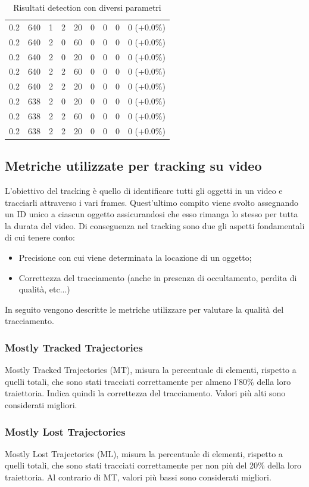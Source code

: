 \begin{table}[h!]
\begin{tabular}{|c|c|c|c|c|c|c|c|c|}
0.2 & 640 & 1 & 2 & 20 & 0 & 0 & 0 & 0 (+0.0\%)\\
0.2 & 640 & 2 & 0 & 60 & 0 & 0 & 0 & 0 (+0.0\%)\\
0.2 & 640 & 2 & 0 & 20 & 0 & 0 & 0 & 0 (+0.0\%)\\
0.2 & 640 & 2 & 2 & 60 & 0 & 0 & 0 & 0 (+0.0\%)\\
0.2 & 640 & 2 & 2 & 20 & 0 & 0 & 0 & 0 (+0.0\%)\\
0.2 & 638 & 2 & 0 & 20 & 0 & 0 & 0 & 0 (+0.0\%)\\
0.2 & 638 & 2 & 2 & 60 & 0 & 0 & 0 & 0 (+0.0\%)\\
0.2 & 638 & 2 & 2 & 20 & 0 & 0 & 0 & 0 (+0.0\%)\\
\hline
\end{tabular}
\caption{Risultati detection con diversi parametri}
\label{risultati detection con diversi parametri}
\end{table}

\subsection{Metriche utilizzate per tracking su video}
L'obiettivo del tracking è quello di identificare tutti gli oggetti in un video e tracciarli attraverso i vari frames. Quest'ultimo compito viene svolto assegnando un ID unico a ciascun oggetto assicurandosi che esso rimanga lo stesso per tutta la durata del video. Di conseguenza nel tracking sono due gli aspetti fondamentali di cui tenere conto:
\begin{itemize}
\item Precisione con cui viene determinata la locazione di un oggetto;
\item Correttezza del tracciamento (anche in presenza di occultamento, perdita di qualità, etc...)
\end{itemize}
In seguito vengono descritte le metriche utilizzare per valutare la qualità del tracciamento.

\subsubsection{Mostly Tracked Trajectories}
Mostly Tracked Trajectories (MT), misura la percentuale di elementi, rispetto a quelli totali, che sono stati tracciati correttamente per almeno l'80\% della loro traiettoria. Indica quindi la correttezza del tracciamento. Valori più alti sono considerati migliori.
\subsubsection{Mostly Lost Trajectories}
Mostly Lost Trajectories (ML), misura la percentuale di elementi, rispetto a quelli totali, che sono stati tracciati correttamente per non più del 20\% della loro traiettoria. Al contrario di MT, valori più bassi sono considerati migliori.
